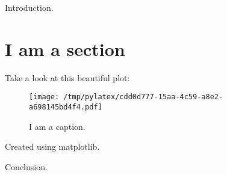 \documentclass{article}%
\begin{document}
%
Introduction.%
\section*{I am a section}%
Take a look at this beautiful plot:%


\begin{figure}[htbp]%
\centering%
\texttt{[image: /tmp/pylatex/cdd0d777-15aa-4c59-a8e2-a698145bd4f4.pdf]}%
\caption{I am a caption.}%
\end{figure}

%
Created using matplotlib.

%
Conclusion.%
\end{document}
